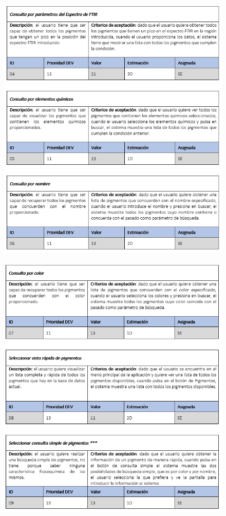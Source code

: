 \begin{figure}[H]
    \centering
    \includegraphics[scale=0.8]{imagenes/diseno/us46.png}
    \label{fig:us46}
\end{figure}

\begin{figure}[H]
    \centering
    \includegraphics[scale=0.8]{imagenes/diseno/us79.png}
    \label{fig:us79}
\end{figure}


